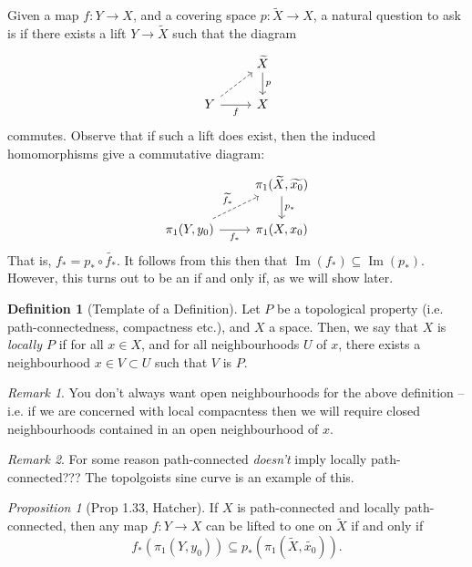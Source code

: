 \documentclass[a4paper]{report}
\theoremstyle{definition}
\newtheorem{definition}{Definition}
\theoremstyle{remark}
\newtheorem{remark}{Remark}
\theoremstyle{proposition}
\newtheorem{proposition}{Proposition}
\theoremstyle{conjecture}
\theoremstyle{lemma}
\theoremstyle{corollary}
\theoremstyle{exercise}
\newcommand{\on}{\operatorname}
\begin{document}
Given a map $f : Y \to X$, and a covering space $p : \widetilde{X} \to X$, 
a natural question to ask is if there exists a lift 
$Y \to \widetilde{X}$ such that the diagram $$\begin{tikzcd}
    & \widetilde{X} \arrow[d, "p"] \\
Y \arrow[r, "f"'] \arrow[ru, dashed] & X                           
\end{tikzcd}$$
commutes. Observe that if such a lift does exist, then the induced 
homomorphisms give a commutative diagram: $$\begin{tikzcd}
    & {\pi_1(\widetilde{X},\widetilde{x_0})} \arrow[d, "p_\ast"] \\
{\pi_1(Y,y_0)} \arrow[r, "f_\ast"'] \arrow[ru, "\widetilde{f_\ast}", dashed] & {\pi_1(X,x_0)}                                            
\end{tikzcd}$$
That is, $f_\ast = p_\ast \circ \widetilde{f_\ast}$. 
It follows from this then that $\on{Im}(f_\ast) \subseteq \on{Im}(p_\ast)$.
However, this turns out to be an if and only if, as we will show later.

\begin{definition}[Template of a Definition]
    Let $P$ be a topological property (i.e. path-connectedness, compactness etc.),
    and $X$ a space. Then, we say that $X$ is \emph{locally $P$} if 
    for all $x \in X$, and for all neighbourhoods $U$ of $x$, 
    there exists a neighbourhood $x \in V \subset U$ such that $V$ is $P$.
\end{definition}

\begin{remark}
    You don't always want open neighbourhoods for the above definition -- i.e. if 
    we are concerned with local compacntess then we will require closed neighbourhoods
    contained in an open neighbourhood of $x$.
\end{remark}

\begin{remark}
    For some reason path-connected \emph{doesn't} imply locally path-connected???
    The topolgoists sine curve is an example of this.
\end{remark}

\begin{proposition}[Prop 1.33, Hatcher]
    If $X$ is path-connected and locally path-connected,
    then any map $f :Y \to X$ can be lifted to one on $\widetilde{X}$
    if and only if 
    $$f_\ast (\pi_1(Y,y_0)) \subseteq p_\ast(\pi_1(\widetilde{X},\widetilde{x_0})).$$
\end{proposition}
\end{document}
